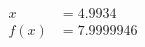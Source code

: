 \documentclass[preview]{standalone}
\begin{document}
\begin{align*}
x &= 4.9934\\f(x) &= 7.9999946
\end{align*}
\end{document}
